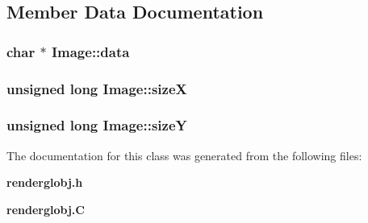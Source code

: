 \subsection{Member Data Documentation}
\subsubsection{\setlength{\rightskip}{0pt plus 5cm}char $\ast$ Image::data}\label{classImage_m2}


\subsubsection{\setlength{\rightskip}{0pt plus 5cm}unsigned long Image::size\-X}\label{classImage_m0}


\subsubsection{\setlength{\rightskip}{0pt plus 5cm}unsigned long Image::size\-Y}\label{classImage_m1}




The documentation for this class was generated from the following files:\begin{CompactItemize}
\item 
{\bf renderglobj.h}\item 
{\bf renderglobj.C}\end{CompactItemize}
